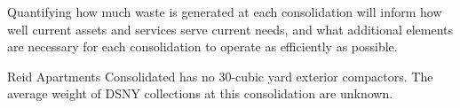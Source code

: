 
    Quantifying how much waste is generated at each consolidation will inform how well current assets and services serve current needs, and what additional elements are necessary for each consolidation to operate as efficiently as possible.
    
    Reid Apartments Consolidated has no 30-cubic yard exterior compactors. The average weight of DSNY collections at this consolidation are unknown.